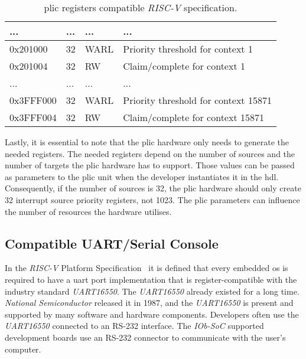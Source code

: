 \begin{table}[!htb]
\begin{tabular}{|l|l|l|l|}
    ...              & ...                  & ...                & ...                                               \\ \hline
    0x201000         & 32                   & WARL               & Priority threshold for context 1                  \\ \hline
    0x201004         & 32                   & RW                 & Claim/complete for context 1                      \\ \hline
    ...              & ...                  & ...                & ...                                               \\ \hline
    0x3FFF000        & 32                   & WARL               & Priority threshold for context 15871              \\ \hline
    0x3FFF004        & 32                   & RW                 & Claim/complete for context 15871                  \\ \hline
    \end{tabular}
    \caption{\acrshort{plic} registers compatible \textit{RISC-V} specification.}
    \label{tab:plic_spec_regs}
\end{table}


Lastly, it is essential to note that the \acrshort{plic} hardware only needs to generate the needed registers. The needed registers depend on the number of sources and the number of targets the \acrshort{plic} hardware has to support. Those values can be passed as parameters to the \acrshort{plic} unit when the developer instantiates it in the \acrlong{hdl}. Consequently, if the number of sources is 32, the \acrshort{plic} hardware should only create 32 interrupt source priority registers, not 1023. The \acrshort{plic} parameters can influence the number of resources the hardware utilises.

\subsection{Compatible UART/Serial Console}
\label{section:serial_console}
In the \textit{RISC-V} Platform Specification~\cite{riscv_platform_specification} it is defined that every embedded \acrfull{os} is required to have a \acrshort{uart} port implementation that is register-compatible with the industry standard \textit{UART16550}. The \textit{UART16550} already existed for a long time. \textit{National Semiconductor} released it in 1987, and the \textit{UART16550} is present and supported by many software and hardware components. Developers often use the \textit{UART16550} connected to an RS-232 interface. The \textit{IOb-SoC} supported development boards use an RS-232 connector to communicate with the user's computer.

